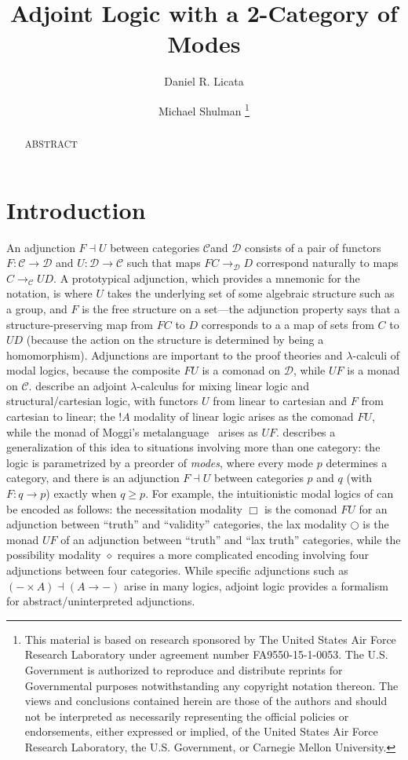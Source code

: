 \documentclass{drl-common/llncs}
\title{Adjoint Logic with a 2-Category of Modes}
\author{Daniel R. Licata\inst{1} \and Michael Shulman\inst{2}
\thanks{
This material is based on research sponsored by The United States Air
Force Research Laboratory under agreement number FA9550-15-1-0053. The
U.S. Government is authorized to reproduce and distribute reprints for
Governmental purposes notwithstanding any copyright notation thereon.
The views and conclusions contained herein are those of the authors and
should not be interpreted as necessarily representing the official
policies or endorsements, either expressed or implied, of the United
States Air Force Research Laboratory, the U.S. Government, or Carnegie
Mellon University.
}}
\institute{Wesleyan University \and University of San Diego}
\newcommand{\C}{\ensuremath{\mathcal{C}}}
\newcommand{\D}{\ensuremath{\mathcal{D}}}
\newcommand{\la}{\ensuremath{\dashv}}
\newcommand{\arrow}[3]{\ensuremath{#2 \longrightarrow_{#1} #3}}
\begin{document}
\maketitle

\begin{abstract}
ABSTRACT
\end{abstract}

\section{Introduction}

An adjunction $F \la U$ between categories \C and \D\/ consists of a
pair of functors $F : \C \to \D$ and $U : \D \to \C$ such that maps
\arrow{\D}{F C}{D} correspond naturally to maps \arrow{\C}{C}{U D}.  A
prototypical adjunction, which provides a mnemonic for the notation, is
where $U$ takes the underlying set of some algebraic structure such as a
group, and $F$ is the free structure on a set---the adjunction property
says that a structure-preserving map from $F C$ to $D$ corresponds to a
a map of sets from $C$ to $U D$ (because the action on the structure is
determined by being a homomorphism).  Adjunctions are important to the
proof theories and $\lambda$-calculi of modal logics, because the
composite $FU$ is a comonad on \D, while $UF$ is a monad on $\C$.
\citet{bentonwadler96adjoint} describe an adjoint $\lambda$-calculus for
mixing linear logic and structural/cartesian logic, with functors $U$
from linear to cartesian and $F$ from cartesian to linear; the $! A$
modality of linear logic arises as the comonad $FU$, while the monad of
Moggi's metalanguage~\citep{moggi91monad} arises as $UF$.
\citet{reed09adjoint} describes a generalization of this idea to
situations involving more than one category: the logic is parametrized
by a preorder of \emph{modes}, where every mode $p$ determines a
category, and there is an adjunction $F \la U$ between categories $p$
and $q$ (with $F : q \to p$) exactly when $q \ge p$.  For example, the
intuitionistic modal logics of \citet{pfenningdavies} can be encoded as
follows: the necessitation modality $\Box$ is the comonad $FU$ for an
adjunction between ``truth'' and ``validity'' categories, the lax
modality $\bigcirc$ is the monad $UF$ of an adjunction between ``truth''
and ``lax truth'' categories, while the possibility modality $\diamond$
requires a more complicated encoding involving four adjunctions between
four categories.  While specific adjunctions such as $(- \times A) \la
(A \to -)$ arise in many logics, adjoint logic provides a formalism for
abstract/uninterpreted adjunctions.
\end{document}
